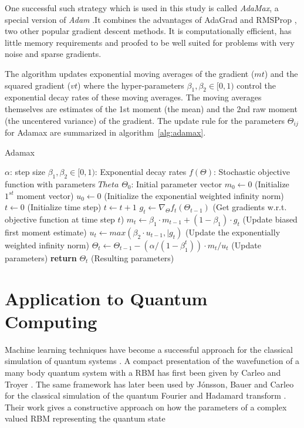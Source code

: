 One successful such strategy which is used in this study is called \textit{AdaMax}, a special version 
of \textit{Adam} \cite{kingma2014adam}.It combines the advantages of AdaGrad \cite{duchi2011adaptive} and RMSProp \cite{bengio2015rmsprop},
two other popular gradient descent methods. It is computationally efficient, has little
memory requirements and proofed to be well suited for problems with very noise and sparse gradients.

The algorithm updates exponential moving averages of the gradient ($mt$) and the squared gradient
($vt$) where the hyper-parameters $\beta_1, \beta_2 \in [0, 1)$ control the exponential decay rates of these moving
averages. The moving averages themselves are estimates of the 1st moment (the mean) and the
2nd raw moment (the uncentered variance) of the gradient. The update rule for the parameters $\Theta_{ij}$ for Adamax are summarized in 
algorithm~\ref{alg:adamax}.

\begin{algorithm}
    \label{alg:adamax}
    \caption{Adamax}\label{euclid}
    \begin{algorithmic}[1]
        \Require $\alpha$: step size
        \Require $\beta_1, \beta_2 \in [0,1)$: Exponential decay rates
        \Require $f(\Theta)$: Stochastic objective function with parameters $Theta$
        \Require $\Theta_0$: Initial parameter vector
        \State $m_0 \gets 0$ (Initialize $1^{st}$ moment vector)
        \State $u_0 \gets 0$ (Initialize the exponential weighted infinity norm)
        \State $t \gets 0$ (Initialize time step)
            \State $t\gets t+1$
            \State $g_t \gets \nabla_{\Theta}f_t(\Theta_{t-1})$ (Get gradients w.r.t. objective function at time step $t$)
            \State $m_t \gets \beta_1 \cdot m_{t-1} + (1-\beta_1) \cdot g_t$ (Update biased first moment estimate)
            \State $u_t \gets max(\beta_2 \cdot u_{t-1}, \vert{g_t})$ (Update the exponentially weighted infinity norm)
            \State $\Theta_t \gets \Theta_{t-1} - (\alpha/ (1-\beta_1^t)) \cdot m_t/u_t$ (Update parameters)
        \EndWhile
        \State \textbf{return} $\Theta_t$ (Resulting parameters)
    \end{algorithmic}
\end{algorithm}

\section{Application to Quantum Computing}
\label{sec:applicationToQuantumComputing}
Machine learning techniques have become a successful approach for the classical simulation
of quantum systems \cite{carleo2017solving, deng2017quantum, carleo2018constructing}. 
A compact presentation of the wavefunction of a many body quantum system with 
a RBM has first been given by Carleo and Troyer \cite{carleo2017solving}.
The same framework has later been used by J\'{o}nsson, Bauer and Carleo for the classical simulation of the quantum Fourier 
and Hadamard transform \cite{jnsson2018neuralnetwork}. Their work gives a constructive approach on how the parameters of a complex 
valued RBM representing the quantum state

